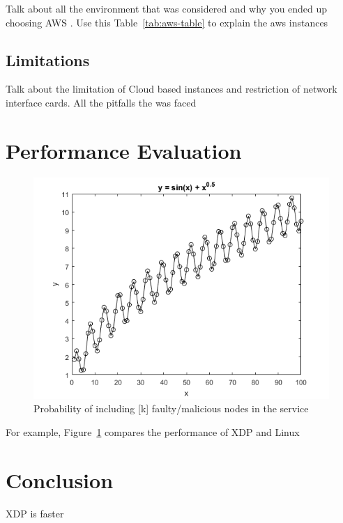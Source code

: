 \documentclass[12pt,titlepage]{article}
\begin{document}
Talk about all the environment that was considered and why you ended up choosing AWS . Use this Table~\ref{tab:aws-table} to explain the aws instances

\subsection{Limitations}

Talk about the limitation of Cloud based instances and restriction of network interface cards. All the pitfalls the was faced

\section{Performance Evaluation}


\begin{figure}
	\begin{center}
		\includegraphics[scale=0.9]{img/plot.png}
	\end{center}
	\caption{Probability of including [k] faulty/malicious nodes in the service}
	\label{graph:sample-plot}
\end{figure}

For example, Figure~\ref{graph:sample-plot} compares the performance of XDP and Linux

\section{Conclusion}

XDP is faster




\begin{spacing}{1}


\end{spacing}
\end{document}
